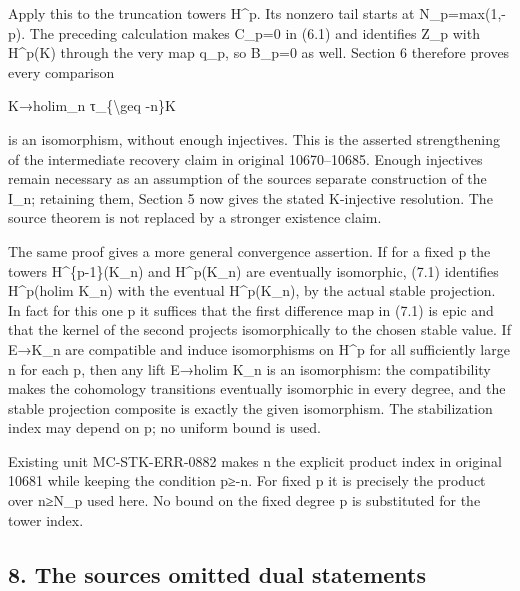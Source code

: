 \documentclass[11pt]{article}
\begin{document}
Apply this to the truncation tower\textquotesingle s H\^{}p. Its nonzero tail starts at N\_\allowbreak{}p\allowbreak{}=max(1,\allowbreak{}-p)\allowbreak{}. The preceding calculation makes C\_\allowbreak{}p\allowbreak{}=0 in (6.1)\allowbreak{} and identifies Z\_\allowbreak{}p with H\textasciicircum{}p(K)\allowbreak{} through the very map q\_\allowbreak{}p,\allowbreak{} so B\_\allowbreak{}p\allowbreak{}=0 as well. Section 6 therefore proves every comparison

K\allowbreak{}→holim\_\allowbreak{}n τ\_\allowbreak{}\{\textbackslash{}geq -n\}K

is an isomorphism,\allowbreak{} without enough injectives. This is the asserted strengthening of the intermediate recovery claim in original 10670–\allowbreak{}10685. Enough injectives remain necessary as an assumption of the source\textquotesingle s separate construction of the I\_\allowbreak{}n; retaining them,\allowbreak{} Section 5 now gives the stated K-injective resolution. The source theorem is not replaced by a stronger existence claim.

The same proof gives a more general convergence assertion. If for a fixed p the towers H\textasciicircum{}\{p-1\}(K\_\allowbreak{}n)\allowbreak{} and H\textasciicircum{}p(K\_\allowbreak{}n)\allowbreak{} are eventually isomorphic,\allowbreak{} (7.1)\allowbreak{} identifies H\^{}p(holim K\_\allowbreak{}n)\allowbreak{} with the eventual H\textasciicircum{}p(K\_\allowbreak{}n)\allowbreak{},\allowbreak{} by the actual stable projection. In fact for this one p it suffices that the first difference map in (7.1)\allowbreak{} is epic and that the kernel of the second projects isomorphically to the chosen stable value. If E\allowbreak{}→K\_\allowbreak{}n are compatible and induce isomorphisms on H\^{}p for all sufficiently large n for each p,\allowbreak{} then any lift E\allowbreak{}→holim K\_\allowbreak{}n is an isomorphism:\allowbreak{} the compatibility makes the cohomology transitions eventually isomorphic in every degree,\allowbreak{} and the stable projection composite is exactly the given isomorphism. The stabilization index may depend on p; no uniform bound is used.

Existing unit MC-STK-ERR-0882 makes n the explicit product index in original 10681 while keeping the condition p≥-n. For fixed p it is precisely the product over n≥N\_\allowbreak{}p used here. No bound on the fixed degree p is substituted for the tower index.

\subsection{8. The source\textquotesingle s omitted dual statements}\label{proofs-10435-10686-the-sources-omitted-dual-statements}
\end{document}
